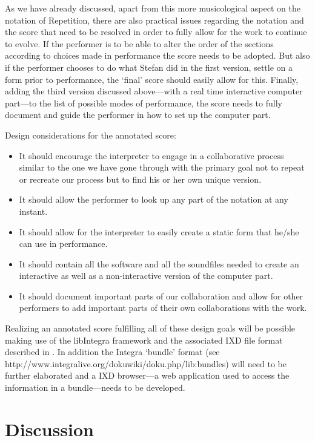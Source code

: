 As we have already discussed, apart from this more musicological
aspect on the notation of Repetition, there are also practical issues
regarding the notation and the score that need to be resolved in order
to fully allow for the work to continue to evolve. If the performer is
to be able to alter the order of the sections according to choices
made in performance the score needs to be adopted. But also if the
performer chooses to do what Stefan did in the first version, settle
on a form prior to performance, the `final' score should easily allow
for this. Finally, adding the third version discussed above---with a
real time interactive computer part---to the list of possible modes of
performance, the score needs to fully document and guide the performer
in how to set up the computer part.

Design considerations for the annotated score: 

\begin{itemize}
\item It should encourage the interpreter to engage in a collaborative
  process similar to the one we have gone through with the primary
  goal not to repeat or recreate our process but to find his or her
  own unique version.  
\item It should allow the performer to look up any part of the
  notation at any instant.
\item It should allow for the interpreter to easily create a static
  form that he/she can use in performance.
\item It should contain all the software and all the soundfiles needed
  to create an interactive as well as a non-interactive version of the
  computer part.
\item It should document important parts of our collaboration and
  allow for other performers to add important parts of their own
  collaborations with the work.
\end{itemize}
Realizing an annotated score fulfilling all of these design goals will
be possible making use of the libIntegra framework and the associated
IXD file format described in \citet{frisk-bull07}. In addition the
Integra `bundle' format (see
http://www.integralive.org/dokuwiki/doku.php/lib:bundles) will need to
be further elaborated and a IXD browser---a web application used to
access the information in a bundle---needs to be developed.

\section{Discussion}
\label{sec:discussion}


